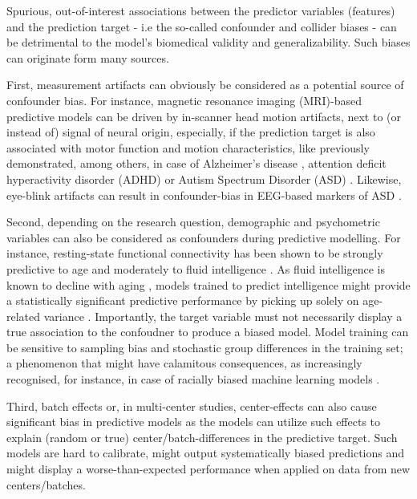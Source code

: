 \documentclass{article}
\begin{document}
Spurious, out-of-interest associations between the predictor variables (features) and the prediction target - i.e the so-called confounder and collider biases \citep{prosperi2020causal} - can be detrimental to the model's biomedical validity and generalizability. Such biases can originate form many sources.

First, measurement artifacts can obviously be considered as a potential source of confounder bias. For instance, magnetic resonance imaging (MRI)-based predictive models can be driven by in-scanner head motion artifacts, next to (or instead of) signal of neural origin, especially, if the prediction target is also associated with motor function and motion characteristics, like previously demonstrated, among others, in case of Alzheimer's disease \citep{rao2017predictive}, attention deficit hyperactivity disorder (ADHD) \citep{eloyan2012automated, couvy2016head} or Autism Spectrum Disorder (ASD) \citep{gotts2013perils, spisak2014voxel, spisak2019optimal}. Likewise, eye-blink artifacts can result in confounder-bias in EEG-based markers of ASD  \citep{eldridge2014robust}.

Second, depending on the research question, demographic and psychometric variables can also be considered as confounders during predictive modelling. For instance, resting-state functional connectivity has been shown to be strongly predictive to age \citep{dukart2011age, wang2012decoding} and moderately to fluid intelligence \citep{ cole2012global, he2020deep}. As fluid intelligence is known to decline with aging \citep{kievit2018neural}, models trained to predict intelligence might provide a statistically significant predictive performance by picking up solely on age-related variance \citep{dubois2018distributed, lohmann2021predicting}.
Importantly, the target variable must not necessarily display a true association to the confoudner to produce a biased model. Model training can be sensitive to sampling bias and stochastic group differences in the training set; a phenomenon that might have calamitous consequences, as increasingly recognised, for instance, in case of racially biased machine learning models \citep{ obermeyer2019dissecting, lwowski2021risk}.

Third, batch effects or, in multi-center studies, center-effects can also cause significant bias in predictive models \citep{leek2010tackling, da2020performance} as the models can utilize such effects to explain (random or true) center/batch-differences in the predictive target. Such models are hard to calibrate, might output systematically biased predictions and might display a worse-than-expected performance when applied on data from new centers/batches.
\end{document}
